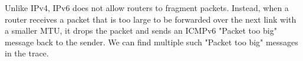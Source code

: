 Unlike IPv4, IPv6 does not allow routers to fragment packets. Instead, when a router receives a packet that is too large to be forwarded over the next link with a smaller MTU, it drops the packet and sends an ICMPv6 "Packet too big" message back to the sender. We can find multiple such "Packet too big" messages in the trace.